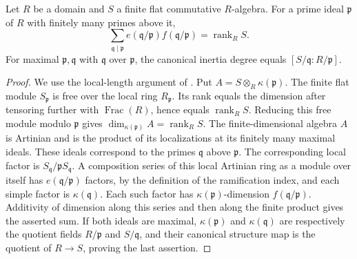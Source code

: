 \begin{theorem}
\label{fw:finite-flat-degree-identity}
\mathlibok
Let $R$ be a domain and $S$ a finite flat commutative $R$-algebra.
For a prime ideal $\mathfrak p$ of $R$ with finitely many primes above it,
\[
 \sum_{\mathfrak q\mid\mathfrak p} e(\mathfrak q/\mathfrak p)
 f(\mathfrak q/\mathfrak p)=\operatorname{rank}_R S.
\]
For maximal $\mathfrak p,\mathfrak q$ with $\mathfrak q$ over $\mathfrak p$,
the canonical inertia degree equals
$[S/\mathfrak q:R/\mathfrak p]$.
\end{theorem}
\begin{proof}
We use the local-length argument of \cite{MathlibRamificationInertia}.
Put $A=S\otimes_R\kappa(\mathfrak p)$. The finite flat module
$S_{\mathfrak p}$ is free over the local ring $R_{\mathfrak p}$.
Its rank equals the dimension after tensoring further with
$\operatorname{Frac}(R)$, hence equals $\operatorname{rank}_R S$.
Reducing this free module modulo $\mathfrak p$ gives
$\dim_{\kappa(\mathfrak p)} A=\operatorname{rank}_R S$.
The finite-dimensional algebra $A$ is Artinian and is the product of
its localizations at its finitely many maximal ideals. These ideals
correspond to the primes $\mathfrak q$ above $\mathfrak p$.
The corresponding local factor is
$S_{\mathfrak q}/\mathfrak pS_{\mathfrak q}$. A composition series of
this local Artinian ring as a module over itself has
$e(\mathfrak q/\mathfrak p)$ factors, by the definition of the
ramification index, and each simple factor is
$\kappa(\mathfrak q)$. Each such factor has
$\kappa(\mathfrak p)$-dimension $f(\mathfrak q/\mathfrak p)$.
Additivity of dimension along this series and then along the finite
product gives the asserted sum. If both ideals are maximal,
$\kappa(\mathfrak p)$ and $\kappa(\mathfrak q)$ are respectively the
quotient fields $R/\mathfrak p$ and $S/\mathfrak q$, and their canonical
structure map is the quotient of $R\to S$, proving the last assertion.
\end{proof}

